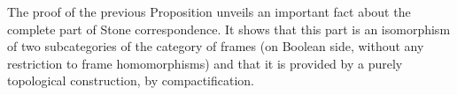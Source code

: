 The proof of the previous Proposition unveils an important fact about the complete part of Stone correspondence. It shows that this part is an isomorphism of two subcategories of the category of frames (on Boolean side, without any restriction to frame homomorphisms) and that it is provided by a purely topological construction, by compactification.

%
%
